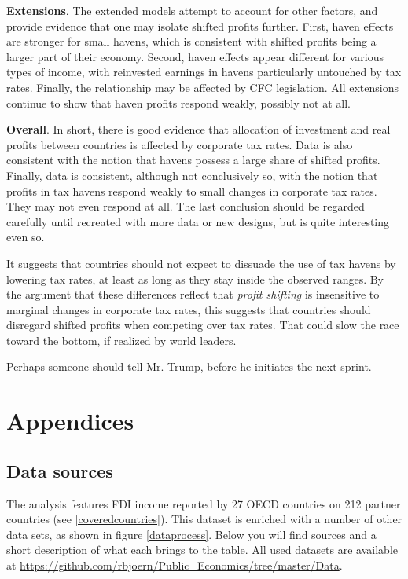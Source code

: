 \documentclass[twoside,a4paper,11pt]{article}
\begin{document}
\textbf{Extensions}. The extended models attempt to account for other factors, and provide evidence that one may isolate shifted profits further. First, haven effects are stronger for small havens, which is consistent with shifted profits being a larger part of their economy. Second, haven effects appear different for various types of income, with reinvested earnings in havens particularly untouched by tax rates. Finally, the relationship may be affected by CFC legislation. All extensions continue to show that haven profits respond weakly, possibly not at all. 

\textbf{Overall}. In short, there is good evidence that allocation of investment and real profits between countries is affected by corporate tax rates. Data is also consistent with the notion that havens possess a large share of shifted profits. Finally, data is consistent, although not conclusively so, with the notion that profits in tax havens respond weakly to small changes in corporate tax rates. They may not even respond at all. The last conclusion should be regarded carefully until recreated with more data or new designs, but is quite interesting even so. 

It suggests that countries should not expect to dissuade the use of tax havens by lowering tax rates, at least as long as they stay inside the observed ranges. By the argument that these differences reflect that \textit{profit shifting} is insensitive to marginal changes in corporate tax rates, this suggests that countries should disregard shifted profits when competing over tax rates. That could slow the race toward the bottom, if realized by world leaders.  

Perhaps someone should tell Mr. Trump, before he initiates the next sprint. 

\newpage
\renewcommand*{\bibfont}{\footnotesize}
\printbibliography[heading=bibnumbered]

\newpage
\section{Appendices}
\subsection{Data sources}\label{AppSources}
The analysis features FDI income reported by 27 OECD countries on 212 partner countries (see \ref{coveredcountries}). This dataset is enriched with a number of other data sets, as shown in figure \ref{dataprocess}. Below you will find sources and a short description of what each brings to the table. All used datasets are available at \url{https://github.com/rbjoern/Public_Economics/tree/master/Data}. 
\end{document}
